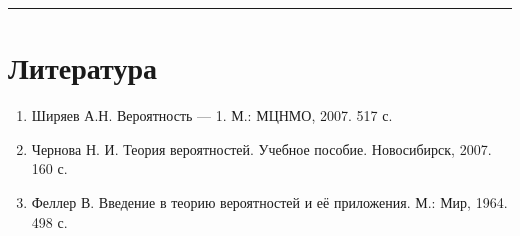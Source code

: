 \documentclass[11pt,a4paper]{article}
\renewcommand{\linethickness}{0.1ex}
\providecommand{\tightlist}{%
      \setlength{\itemsep}{0pt}\setlength{\parskip}{0pt}}
\begin{document}
    \begin{center}\rule{0.5\linewidth}{\linethickness}\end{center}

    \hypertarget{ux43bux438ux442ux435ux440ux430ux442ux443ux440ux430}{%
\section*{Литература}\label{ux43bux438ux442ux435ux440ux430ux442ux443ux440ux430}}

\begin{enumerate}
\def\labelenumi{\arabic{enumi}.}
\tightlist
\item
  Ширяев А.Н. Вероятность --- 1. М.: МЦНМО, 2007. 517 с.
\item
  Чернова Н. И. Теория вероятностей. Учебное пособие. Новосибирск, 2007.
  160 с.
\item
  Феллер В. Введение в теорию вероятностей и её приложения. М.: Мир,
  1964. 498 с.
\end{enumerate}


    
    
    
\end{document}
